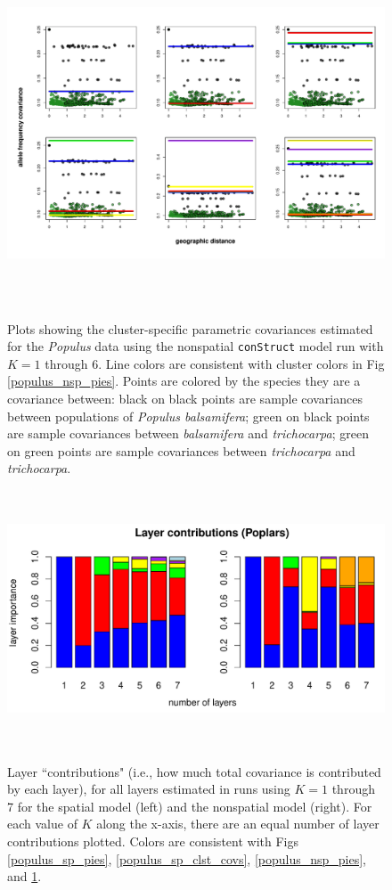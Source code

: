 \documentclass[12pt]{article}
\newcommand{\tri}{\textit{trichocarpa}}
\newcommand{\bals}{\textit{balsamifera}}
\begin{document}
\begin{figure}
	\centering
		{\includegraphics[width=6in,height=4in]{figs/populus/populus_nsp_clst_covs.pdf}}
	\caption{
	Plots showing the cluster-specific parametric covariances 
	estimated for the \textit{Populus} data using 
	the nonspatial \texttt{conStruct} model run with $K=1$ through 6.
	Line colors are consistent with cluster colors in Fig \ref{populus_nsp_pies}.
	Points are colored by the species they are a covariance between:
	black on black points are sample covariances between populations of \textit{Populus balsamifera};
	green on black points are sample covariances between \bals{} and \tri{};
	green on green points are sample covariances between \tri{} and \tri{}.
    }\label{populus_nsp_clst_covs}
\end{figure}

\begin{figure}
	\centering
		{\includegraphics[width=6in,height=3in]{figs/populus/populus_laycon_barplots.pdf}}
	\caption{
	Layer ``contributions" (i.e., how much total covariance is contributed by each layer), 
	for all layers estimated in runs using $K = 1$ through 7 
	for the spatial model (left) and the nonspatial model (right).
	For each value of $K$ along the x-axis, there are an equal number of layer contributions plotted.
	Colors are consistent with Figs \ref{populus_sp_pies}, \ref{populus_sp_clst_covs}, \ref{populus_nsp_pies}, and \ref{populus_nsp_clst_covs}.
    }\label{populus_laycon}
\end{figure}
\end{document}
